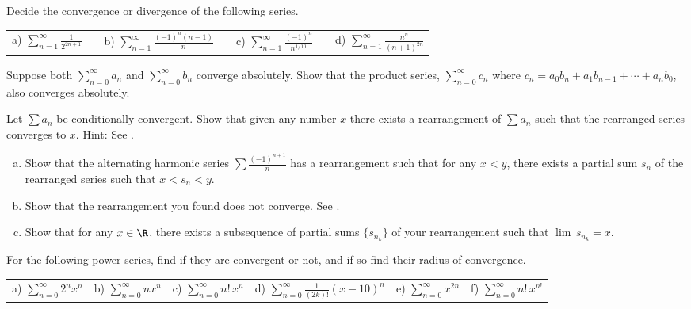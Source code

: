 \documentclass[12pt]{book}
\begin{document}
\begin{exercise}
Decide the convergence or divergence of the following series.

\medskip

\noindent
\begin{tabular}{lllllll}
a)
$\displaystyle \sum_{n=1}^\infty \frac{1}{2^{2n+1}}$
& &
b)
$\displaystyle \sum_{n=1}^\infty \frac{{(-1)}^{n}(n-1)}{n}$
& &
c)
$\displaystyle \sum_{n=1}^\infty \frac{{(-1)}^n}{n^{1/10}}$
& &
d)
$\displaystyle \sum_{n=1}^\infty \frac{n^n}{{(n+1)}^{2n}}$
\end{tabular}
\end{exercise}

\begin{exercise}
Suppose both $\sum_{n=0}^\infty a_n$ and $\sum_{n=0}^\infty b_n$ 
converge absolutely.
Show that the product series, $\sum_{n=0}^\infty c_n$ where
$c_n = a_0 b_n + a_1 b_{n-1} + \cdots + a_n b_0$, also converges absolutely.
\end{exercise}

\begin{exercise}[Challenging] \label{exercise:seriesconvergestoanything}
Let $\sum a_n$ be conditionally convergent.
Show that given any number $x$
there exists a rearrangement of $\sum a_n$
such that the rearranged series converges to $x$.
Hint: See .
\end{exercise}

\begin{exercise}
\begin{enumerate}[a)]
 \item Show that the alternating harmonic series $\sum
\frac{{(-1)}^{n+1}}{n}$ has a rearrangement
such that for any $x < y$, there exists a partial sum $s_n$
of the rearranged series such that $x < s_n < y$.
  \item Show that the rearrangement you found does not converge.
See .
   \item Show that for any $x \in \R$, there exists a subsequence of
partial sums $\{ s_{n_k} \}$ of your rearrangement such that 
$\lim \, s_{n_k} = x$.
\end{enumerate}
\end{exercise}

\begin{exercise}
For the following power series, find if they are convergent or not, and
if so find their radius of convergence.

\medskip

\noindent
\begin{tabular}{llllll}
a)
$\displaystyle \sum_{n=0}^\infty 2^n x^n$
&
b) $\displaystyle \sum_{n=0}^\infty n x^n$
& 
c) 
$\displaystyle \sum_{n=0}^\infty n! \, x^n$
&
d) $\displaystyle \sum_{n=0}^\infty \frac{1}{(2k)!} {(x-10)}^n$
&
e) $\displaystyle \sum_{n=0}^\infty x^{2n}$
&
f) $\displaystyle \sum_{n=0}^\infty n! \, x^{n!}$
\end{tabular}
\end{exercise}
\end{document}
